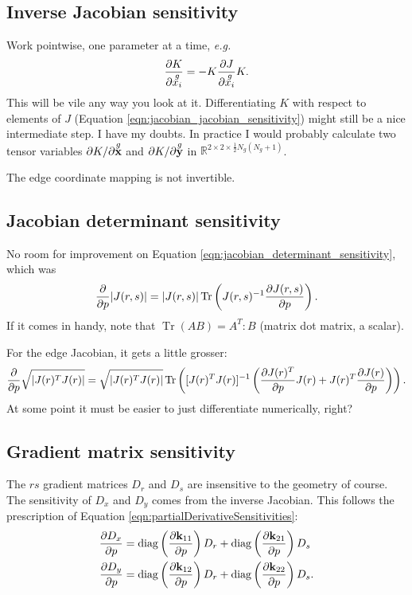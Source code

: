 \subsection{Inverse Jacobian sensitivity}

Work pointwise, one parameter at a time, \emph{e.g.}
%
\begin{equation}
\frac{\partial{K}}{\partial{\overset{g}{x_i}}} = - K \frac{\partial{J}}{\partial{\overset{g}{x_i}}} K.
\end{equation}
%
This will be vile any way you look at it.  Differentiating $K$ with respect to elements of $J$ (Equation \ref{eqn:jacobian_jacobian_sensitivity}) might still be a nice intermediate step.  I have my doubts.  In practice I would probably calculate two tensor variables $\partial{K}/\partial{\overset{g}{\textbf{x}}}$ and $\partial{K}/\partial{\overset{g}{\textbf{y}}}$ in $\mathbb{R}^{2 \times 2 \times \frac{1}{2}N_g(N_g+1)}$.

The edge coordinate mapping is not invertible.

\subsection{Jacobian determinant sensitivity}

No room for improvement on Equation \ref{eqn:jacobian_determinant_sensitivity}, which was
%
\begin{equation}
\frac{\partial{}}{\partial{p}} |J(r,s)| = |J(r,s)| \operatorname{Tr} \left( J(r,s)^{-1} \frac{\partial{J(r,s)}}{\partial{p}} \right).
\end{equation}
%
If it comes in handy, note that $\operatorname{Tr}(AB) = A^T : B$ (matrix dot matrix, a scalar).

For the edge Jacobian, it gets a little grosser:
%
\begin{equation}
\label{eqn:edge_jacobian_determinant_sensitivity}
\frac{\partial{}}{\partial{p}} \sqrt{|J(r)^T J(r)|} = \sqrt{|J(r)^T J(r)|} \operatorname{Tr}\left(
[J(r)^T J(r)]^{-1} \left( \frac{\partial{J(r)^T}}{\partial{p}} J(r) + J(r)^T \frac{\partial{J(r)}}{\partial{p}} \right) \right).
\end{equation}
%
At some point it must be easier to just differentiate numerically, right?

\subsection{Gradient matrix sensitivity}

The $rs$ gradient matrices $D_r$ and $D_s$ are insensitive to the geometry of course.  The sensitivity of $D_x$ and $D_y$ comes from the inverse Jacobian.  This follows the prescription of Equation \ref{eqn:partialDerivativeSensitivities}:
%
\begin{equation}
\label{eqn:gradient_matrix_sensitivity}
\begin{aligned}
\frac{\partial{D_x}}{\partial{p}} &= \operatorname{diag} \left( \frac{\partial{\textbf{k}_{11}}}{\partial{p}} \right) D_r + \operatorname{diag} \left( \frac{\partial{\textbf{k}_{21}}}{\partial{p}} \right) D_s \\
\frac{\partial{D_y}}{\partial{p}} &= \operatorname{diag} \left( \frac{\partial{\textbf{k}_{12}}}{\partial{p}} \right) D_r + \operatorname{diag} \left( \frac{\partial{\textbf{k}_{22}}}{\partial{p}} \right) D_s. \\
\end{aligned}
\end{equation}

